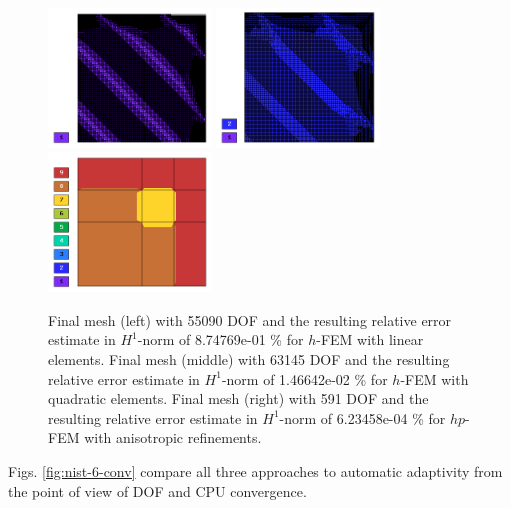 \documentclass[12pt]{elsarticle}
\begin{document}
\begin{figure}[H]
\centering
\vspace{-3mm}
\includegraphics[height=3.7cm]{nist/nist-6/mesh_h1_aniso.png}
\includegraphics[height=3.7cm]{nist/nist-6/mesh_h2_aniso.png}
\includegraphics[height=3.7cm]{nist/nist-6/mesh_hp_aniso.png}
\vspace{-3mm}
\caption{
Final mesh (left) with 55090 DOF and the resulting
relative error estimate in $H^1$-norm of 8.74769e-01 \% for $h$-FEM with linear elements.
Final mesh (middle) with 63145 DOF and the resulting
relative error estimate in $H^1$-norm of 1.46642e-02 \% for $h$-FEM with quadratic elements.
Final mesh (right) with 591 DOF and the resulting
relative error estimate in $H^1$-norm of 6.23458e-04 \% for $hp$-FEM with anisotropic refinements.}
\label{fig:nist-6-hp-aniso}
\end{figure}

Figs. \ref{fig:nist-6-conv} compare all
three approaches to automatic adaptivity from the point
of view of DOF and CPU convergence.
\end{document}
